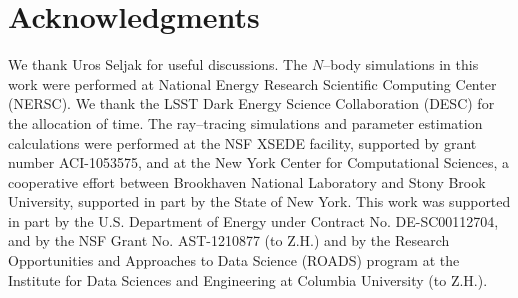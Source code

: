 \documentclass[reprint,aps,prd,superscriptaddress,showkeys,showpacs]{revtex4-1}
\begin{document}

\section*{Acknowledgments}
We thank Uros Seljak for useful discussions. The $N$--body simulations in this work were performed at National Energy Research Scientific Computing Center (NERSC). We thank the LSST Dark Energy Science Collaboration (DESC) for the allocation of time. The ray--tracing simulations and parameter estimation calculations were performed at the NSF XSEDE facility, supported by grant number
ACI-1053575, and at the New York Center for Computational Sciences, a
cooperative effort between Brookhaven National Laboratory and Stony
Brook University, supported in part by the State of New York. This
work was supported in part by the U.S. Department of Energy under
Contract No. DE-SC00112704, and by the NSF Grant
No. AST-1210877 (to Z.H.) and by the Research Opportunities and
Approaches to Data Science (ROADS) program at the Institute for Data
Sciences and Engineering at Columbia University (to Z.H.).




\label{lastpage}
\end{document}
